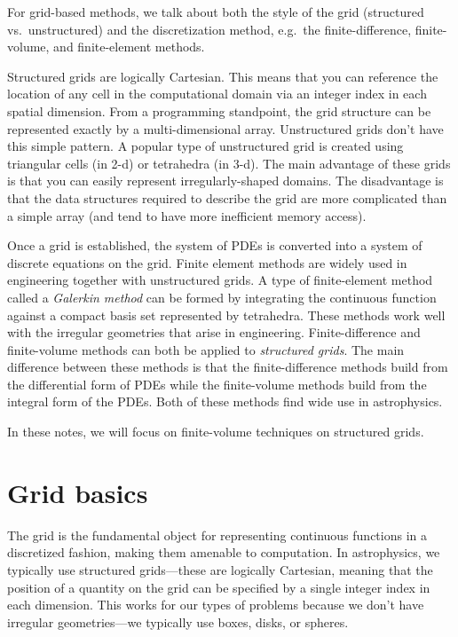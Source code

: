 For grid-based methods, we talk about both the style of the grid
(structured vs.\ unstructured) and the discretization method, e.g.\ the
finite-difference, finite-volume, and finite-element methods.

Structured grids are logically Cartesian.  This means that you can
reference the location of any cell in the computational domain via an
integer index in each spatial dimension.  From a programming
standpoint, the grid structure can be represented exactly by a
multi-dimensional array.  Unstructured grids don't have this simple
pattern.  A popular type of unstructured grid is created using
triangular cells (in 2-d) or tetrahedra (in 3-d).   The main advantage of these grids is that you can easily
represent irregularly-shaped domains.  The disadvantage is that the
data structures required to describe the grid are more complicated
than a simple array (and tend to have more inefficient memory access).

Once a grid is established, the system of PDEs is converted into a 
system of discrete equations on the grid.  Finite element methods are
widely used in engineering together with unstructured grids.  A type
of finite-element method called a {\em Galerkin method} can be formed
by integrating the continuous function against a compact basis set
represented by tetrahedra.  These methods work well with the irregular
geometries that arise in engineering.  Finite-difference and
finite-volume methods can both be applied to {\em structured grids}.
The main difference between these methods is that the
finite-difference methods build from the differential form of PDEs
while the finite-volume methods build from the integral form of the
PDEs.  Both of these methods find wide use in astrophysics.

In these notes, we will focus on finite-volume techniques on
structured grids.


\section{Grid basics}

The grid is the fundamental object for representing continuous
functions in a discretized fashion, making them amenable to
computation.  In astrophysics, we typically use structured
grids---these are logically Cartesian, meaning that the position of a
quantity on the grid can be specified by a single integer index in
each dimension.  This works for our types of problems because
we don't have irregular geometries---we typically use boxes, disks,
or spheres.

